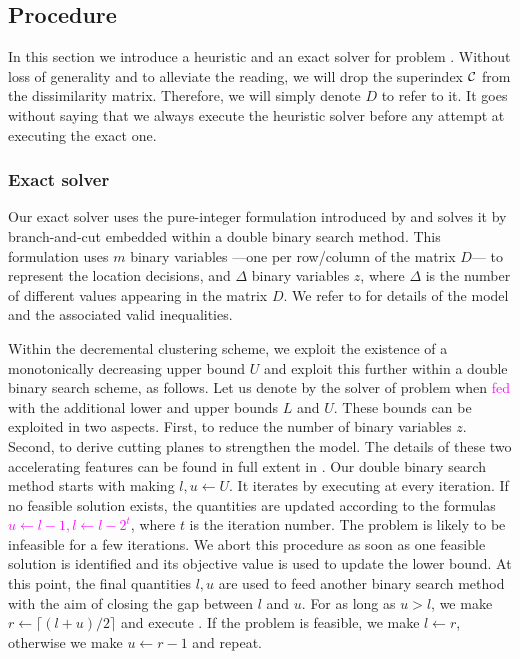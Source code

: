 \documentclass[ijoo,nonblindrev]{informs-ijoo}
\begin{document}
\subsection{Procedure \label{section:decrclust:solvepdp}}

In this section we introduce a heuristic and an exact solver for problem . Without loss of generality and to alleviate the reading, we will drop the superindex $\mathcal{C}$ from the dissimilarity matrix. Therefore, we will simply denote $D$ to refer to it. It goes without saying that we always execute the heuristic solver before any attempt at executing the exact one.

\subsubsection{Exact solver}

Our exact solver uses the pure-integer formulation introduced by \citet{Sayah2017new} and solves it by branch-and-cut embedded within a double binary search method. This formulation uses $m$ binary variables ---one per row/column of the matrix $D$--- to represent the location decisions, and $\Delta$ binary variables $z$, where $\Delta$ is the number of different values appearing in the matrix $D$. We refer to \citet{Sayah2017new} for details of the model and the associated valid inequalities.

Within the decremental clustering scheme, we exploit the existence of a monotonically decreasing upper bound $U$ and exploit this further within a double binary search scheme, as follows. Let us denote by  the solver of problem  when \textcolor{magenta}{fed} with the additional lower and upper bounds $L$ and $U$. These bounds can be exploited in two aspects. First, to reduce the number of binary variables $z$. Second, to derive cutting planes to strengthen the model. The details of these two accelerating features can be found in full extent in \citet{Sayah2017new}. Our double binary search method starts with making $l, u \leftarrow U$. It iterates by executing  at every iteration. If no feasible solution exists, the quantities are updated according to the formulas \textcolor{magenta}{$u \leftarrow l - 1, l\leftarrow l - 2^t$}, where $t$ is the iteration number. The problem  is likely to be infeasible for a few iterations. We abort this procedure as soon as one feasible solution is identified and its objective value is used to update the lower bound. At this point, the final quantities $l, u$ are used to feed another binary search method with the aim of closing the gap between $l$ and $u$. For as long as $u > l$, we make $r\leftarrow \lceil (l + u) / 2\rceil$ and execute . If the problem is feasible, we make $l\leftarrow r$, otherwise we make $u\leftarrow r - 1$ and repeat.
\end{document}
